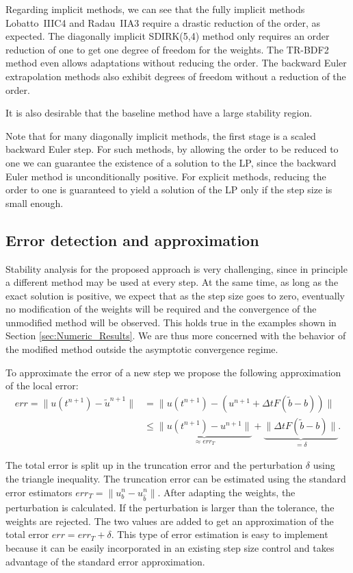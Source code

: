 \documentclass[a4paper]{article}
\numberwithin{equation}{section}
\theoremstyle{plain}
\theoremstyle{definition}
\numberwithin{theorem}{section}
\newcommand{\dt}{{\Delta t}}
\newcommand{\1}{\mathbbm{1}}
\newcommand{\bt}{\tilde{b}}
\begin{document}
Regarding implicit methods,
we can see that the fully implicit methods Lobatto~IIIC4 and Radau~IIA3 require a drastic reduction of the order, as expected.
The diagonally implicit SDIRK(5,4) method only requires an order reduction of one to get one degree of freedom for the weights.
The TR-BDF2 method even allows adaptations without reducing the order.
The backward Euler extrapolation methods also exhibit degrees of freedom without a reduction of the order.

It is also desirable that the baseline method have a large stability region.

Note that for many diagonally implicit methods, the first stage is a scaled backward Euler step.
For such methods, by allowing the order to be reduced to one
we can guarantee the existence of a solution to the LP, since the backward Euler method
is unconditionally positive.  For explicit methods, reducing the order to one is guaranteed
to yield a solution of the LP only if the step size is small enough.

\subsection{Error detection and approximation}\label{sec:error}
Stability analysis for the proposed approach is very challenging, since in principle
a different method may be used at every step.  At the same time, as long as the exact
solution is positive, we expect that as the step size goes to zero, eventually no modification
of the weights will be required and the convergence of the unmodified method will be observed.
This holds true in the examples shown in Section \ref{sec:Numeric_Results}.  We are thus more concerned with
the behavior of the modified method outside the asymptotic convergence regime.

To approximate the error of a new step we propose the following approximation of the local error:
\begin{align}
err = \|u(t^{n+1})-\tilde u^{n+1}\| &= \|u(t^{n+1}) - (u^{n+1}+\dt F(\bt-b))\| \\
 &\leq \underbrace{\|u(t^{n+1})-u^{n+1}\|}_{\approx err_T}+\underbrace{\|\dt F(\bt-b)\|}_{= \delta}. \label{eq:Err}
\end{align}

The total error is split up in the truncation error and the perturbation $\delta$ using the triangle inequality.
The truncation error can be estimated using the standard error estimators $err_T = \| u^{n}_{b} - u^{n}_{\hat{b}} \|$.
After adapting the weights, the perturbation is calculated. If the perturbation is larger than the tolerance, the weights are rejected.
The two values are added to get an approximation of the total error $err = err_T + \delta$.
This type of error estimation is easy to implement because it can be easily
incorporated in an existing step size control and takes advantage of the
standard error approximation.
\end{document}
